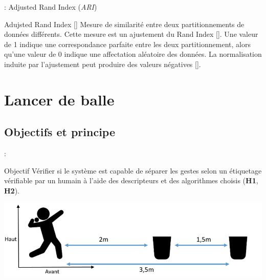 \documentclass[svgnames]{beamer}
\newcommand{\mycite}[1]{[\textit{\cite{#1}}]}
\begin{document}
	\begin{frame}{\secname : Adjusted Rand Index (\textit{ARI})}
		\begin{block}{Adujsted Rand Index \mycite{Morey1984ARI}}
			Mesure de similarité entre deux partitionnements de données différents. Cette mesure est un ajustement du Rand Index \mycite{Rand2971RI}. Une valeur de 1 indique une correspondance parfaite entre les deux partitionnement, alors qu'une valeur de 0 indique une affectation aléatoire des données. La normalisation induite par l'ajustement peut produire des valeurs négatives \mycite{Meila2007Cca}. 
		\end{block}
	\end{frame}

	\section{Lancer de balle}
	\subsection{Objectifs et principe}
	\begin{frame}{\secname : \subsecname}
		\begin{block}{Objectif}
			Vérifier si le système est capable de séparer les gestes selon un étiquetage vérifiable par un humain à l'aide des descripteurs et des algorithmes choisis (\textbf{H1}, \textbf{H2}).
		\end{block}
		
		\vspace{1cm}
		
		\centering
		\includegraphics[scale=0.5]{img/ball_throwing.png}

	\end{frame}
	
\end{document}
